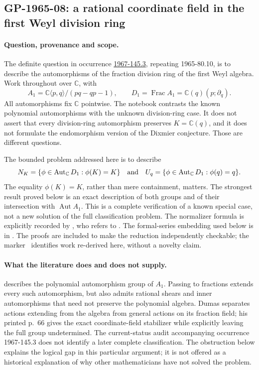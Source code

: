 \subsection{GP-1965-08: a rational coordinate field in the first Weyl division ring}
\label{dev:weyl-coordinate}

\paragraph{Question, provenance and scope.}
The definite question in occurrence \hyperref[item:1967-145.3]{1967-145.3},
repeating 1965-80.10, is to describe the automorphisms of the fraction division
ring of the first Weyl algebra. Work throughout over \(\mathbb C\), with
\[
 A_1=\mathbb C\langle p,q\rangle/(pq-qp-1),\qquad
 D_1=\operatorname{Frac}A_1=\mathbb C(q)(p;\partial_q).
\]
All automorphisms fix \(\mathbb C\) pointwise. The notebook contrasts the
known polynomial automorphisms with the unknown division-ring case. It does
not assert that every division-ring automorphism preserves
\(K=\mathbb C(q)\), and it does not formulate the endomorphism version of the
Dixmier conjecture. Those are different questions.

The bounded problem addressed here is to describe
\[
 N_K=\{\phi\in\operatorname{Aut}_{\mathbb C}D_1:\phi(K)=K\}
 \quad\hbox{and}\quad
 U_q=\{\phi\in\operatorname{Aut}_{\mathbb C}D_1:\phi(q)=q\}.
\]
The equality \(\phi(K)=K\), rather than mere containment, matters. The
strongest result proved below is an exact description of both groups and of
their intersection with \(\operatorname{Aut}A_1\). This is a complete
verification of a known special case, not a new solution of the full
classification problem. The normalizer formula is explicitly recorded by
\citet[\S5.3.3, final Remark, printed p.~66]{dumas2011invariants}, who refers
to \citet{alevdumas1998invariants}. The formal-series embedding used below is
in \citet[\S5.2.2, pp.~59--60]{dumas2011invariants}. The proofs are included
to make the reduction independently checkable; the marker \ours\ identifies
work re-derived here, without a novelty claim.

\paragraph{What the literature does and does not supply.}
\citet[Theorem~8.10]{dixmier1968weyl} describes the polynomial automorphism
group of \(A_1\). Passing to fractions extends every such automorphism, but
also admits rational shears and inner automorphisms that need not preserve
the polynomial algebra. Dumas separates actions extending from the algebra
from general actions on its fraction field; his printed p.~66 gives the
exact coordinate-field stabilizer while explicitly leaving the full group
undetermined. The current-status audit accompanying occurrence 1967-145.3
does not identify a later complete classification. The obstruction below
explains the logical gap in this particular argument; it is not offered as
a historical explanation of why other mathematicians have not solved the
problem.

